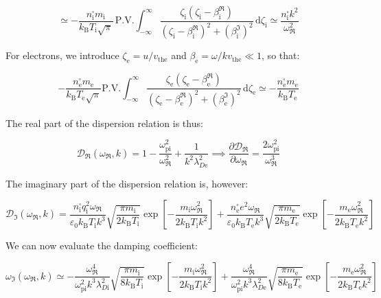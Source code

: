 \begin{equation}
    \simeq-\frac{n_\mathrm{i}^\square m_\mathrm{i}}{k_\mathrm{B}T_\mathrm{i}\sqrt{\pi}}\,\text{P.V.}\int_{-\infty}^\infty\frac{\zeta_\mathrm{i}(\zeta_\mathrm{i}-\beta_\mathrm{i}^{\Re})}{(\zeta_\mathrm{i}-\beta_\mathrm{i}^{\Re})^2+(\beta_\mathrm{i}^{\Im})^2}\,\mathrm{d}\zeta_\mathrm{i}\simeq\frac{n_\mathrm{i}^\square k^2}{\omega_{\Re}^2}
\end{equation}

For electrons, we introduce $\zeta_\text{e}=u/v_\text{the}$ and $\beta_\text{e}=\omega/kv_\text{the}\ll1$, so that:

\begin{equation}
    -\frac{n_\text{e}^\square m_\text{e}}{k_\mathrm{B}T_\text{e}\sqrt{\pi}}\text{P.V.}\int_{-\infty}^\infty\frac{\zeta_\text{e}(\zeta_\text{e}-\beta_\text{e}^{\Re})}{(\zeta_\text{e}-\beta_\text{e}^{\Re})^2+(\beta_\text{e}^{\Im})^2}\,\mathrm{d}\zeta_\text{e}\simeq-\frac{n_\text{e}^\square m_\text{e}}{k_\mathrm{B}T_\text{e}}
\end{equation}

The real part of the dispersion relation is thus:

\begin{equation}
    \mathcal{D}_{\Re}(\omega_{\Re},k)=1-\frac{\omega_\text{pi}^2}{\omega_{\Re}^2}+\frac{1}{k^2\lambda_{D\text{e}}^2}\implies\frac{\partial \mathcal{D}_{\Re}}{\partial\omega_{\Re}}=\frac{2\omega_\text{pi}^2}{\omega_{\Re}^3}
\end{equation}

The imaginary part of the dispersion relation is, however:

\begin{equation}
    \mathcal{D}_{\Im}(\omega_{\Re},k)=\frac{n_\mathrm{i}^\square q_\mathrm{i}^2\omega_{\Re}}{\varepsilon_0k_\mathrm{B}T_\mathrm{i}k^3}\sqrt{\frac{\pi m_\mathrm{i}}{2k_\mathrm{B}T_\mathrm{i}}}\exp{\left[-\frac{m_\mathrm{i}\omega_{\Re}^2}{2k_\mathrm{B}T_\mathrm{i}k^2}\right]}+\frac{n_\text{e}^\square e^2\omega_{\Re}}{\varepsilon_0k_\mathrm{B}T_\text{e}k^3}\sqrt{\frac{\pi m_\text{e}}{2k_\mathrm{B}T_\text{e}}}\exp{\left[-\frac{m_\text{e}\omega_{\Re}^2}{2k_\mathrm{B}T_\text{e}k^2}\right]}
\end{equation}

We can now evaluate the damping coefficient:

\begin{equation}
    \omega_{\Im}(\omega_{\Re},k)\simeq-\frac{\omega_{\Re}^4}{\omega_\text{pi}^2k^3\lambda_{D\mathrm{i}}^2}\sqrt{\frac{\pi m_\mathrm{i}}{8k_\mathrm{B}T_\mathrm{i}}}\exp{\left[-\frac{m_\mathrm{i}\omega_{\Re}^2}{2k_\mathrm{B}T_\mathrm{i}k^2}\right]}+\frac{\omega_{\Re}^4}{\omega_\text{pi}^2k^3\lambda_{D\text{e}}^2}\sqrt{\frac{\pi m_\text{e}}{8k_\mathrm{B}T_\text{e}}}\exp{\left[-\frac{m_\text{e}\omega_{\Re}^2}{2k_\mathrm{B}T_\text{e}k^2}\right]}
\end{equation}

